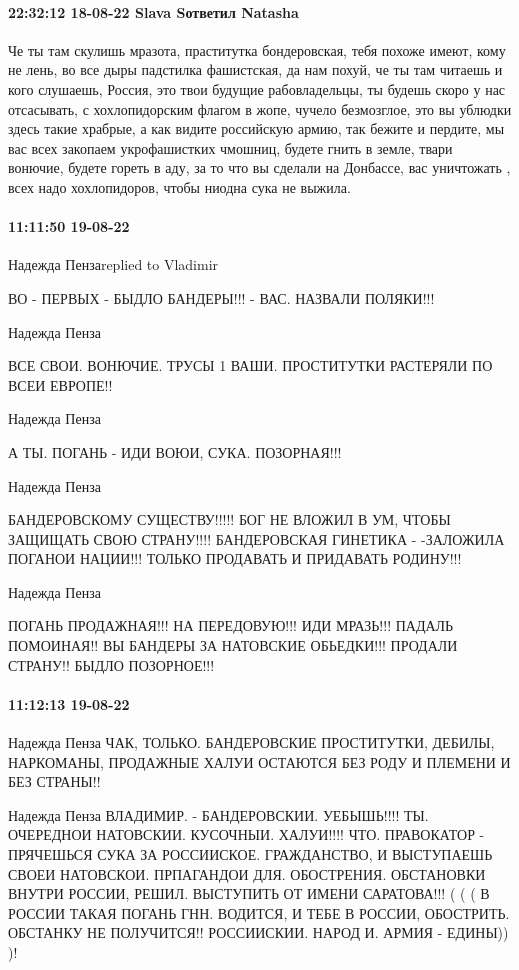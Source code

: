 \paragraph{22:32:12 18-08-22 Slava Sответил Natasha}

Че ты там скулишь мразота, праститутка бондеровская, тебя похоже имеют, кому не
лень, во все дыры падстилка фашистская, да нам похуй, че ты там читаешь и кого
слушаешь, Россия, это твои будущие рабовладельцы, ты будешь скоро у нас
отсасывать, с хохлопидорским флагом в жопе, чучело безмозглое, это вы ублюдки
здесь такие храбрые, а как видите российскую армию, так бежите и пердите, мы
вас всех закопаем укрофашистких чмошниц, будете гнить в земле, твари вонючие,
будете гореть в аду, за то что вы сделали на Донбассе, вас уничтожать , всех
надо хохлопидоров, чтобы ниодна сука не выжила.

\paragraph{11:11:50 19-08-22}

Надежда Пензаreplied to Vladimir

ВО - ПЕРВЫХ - БЫДЛО БАНДЕРЫ!!! - ВАС. НАЗВАЛИ ПОЛЯКИ!!!

Надежда Пенза

ВСЕ СВОИ. ВОНЮЧИЕ. ТРУСЫ 1 ВАШИ. ПРОСТИТУТКИ РАСТЕРЯЛИ ПО ВСЕИ ЕВРОПЕ!!

Надежда Пенза

А ТЫ. ПОГАНЬ - ИДИ ВОЮИ, СУКА. ПОЗОРНАЯ!!!

Надежда Пенза

БАНДЕРОВСКОМУ СУЩЕСТВУ!!!!!
БОГ НЕ ВЛОЖИЛ В УМ, ЧТОБЫ ЗАЩИЩАТЬ СВОЮ СТРАНУ!!!!
БАНДЕРОВСКАЯ ГИНЕТИКА -
-ЗАЛОЖИЛА ПОГАНОИ НАЦИИ!!!
ТОЛЬКО ПРОДАВАТЬ И ПРИДАВАТЬ РОДИНУ!!!

Надежда Пенза

ПОГАНЬ ПРОДАЖНАЯ!!!
НА ПЕРЕДОВУЮ!!!
ИДИ МРАЗЬ!!!
ПАДАЛЬ ПОМОИНАЯ!!
ВЫ БАНДЕРЫ
ЗА НАТОВСКИЕ ОБЬЕДКИ!!!
ПРОДАЛИ СТРАНУ!!
БЫДЛО ПОЗОРНОЕ!!!

\paragraph{11:12:13 19-08-22}

Надежда Пенза
ЧАК, ТОЛЬКО. БАНДЕРОВСКИЕ ПРОСТИТУТКИ, ДЕБИЛЫ, НАРКОМАНЫ, ПРОДАЖНЫЕ ХАЛУИ ОСТАЮТСЯ БЕЗ РОДУ И ПЛЕМЕНИ И БЕЗ СТРАНЫ!!

Надежда Пенза
ВЛАДИМИР. - БАНДЕРОВСКИИ. УЕБЫШЬ!!!! ТЫ. ОЧЕРЕДНОИ НАТОВСКИИ. КУСОЧНЫИ. ХАЛУИ!!!! ЧТО. ПРАВОКАТОР - ПРЯЧЕШЬСЯ СУКА ЗА РОССИИСКОЕ. ГРАЖДАНСТВО, И ВЫСТУПАЕШЬ СВОЕИ НАТОВСКОИ. ПРПАГАНДОИ ДЛЯ. ОБОСТРЕНИЯ. ОБСТАНОВКИ ВНУТРИ РОССИИ, РЕШИЛ. ВЫСТУПИТЬ ОТ ИМЕНИ САРАТОВА!!!
( ( ( В РОССИИ ТАКАЯ ПОГАНЬ ГНН. ВОДИТСЯ, И ТЕБЕ В РОССИИ, ОБОСТРИТЬ. ОБСТАНКУ НЕ ПОЛУЧИТСЯ!!
РОССИИСКИИ. НАРОД И. АРМИЯ - ЕДИНЫ)) )!

